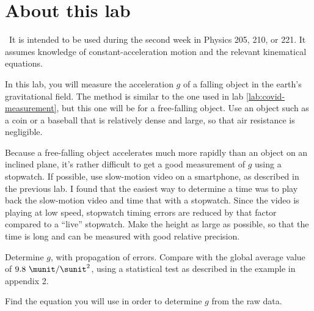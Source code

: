 \addtocounter{chapter}{-1}
\renewcommand\thechapter{c1.2a}
\label{lab:covid-g}

\section*{About this lab}

\covid\ 
It is intended to be used during the second week in Physics 205, 210, or 221.
It assumes knowledge of constant-acceleration motion and the relevant kinematical equations.

\observations

In this lab, you will measure the acceleration $g$ of a falling object in the earth's
gravitational field. The method is similar to the one used in lab \ref{lab:covid-measurement},
but this one will be for a free-falling object. Use an object such as a coin or a baseball
that is relatively dense and large, so that air resistance is negligible.

Because a free-falling object accelerates much more rapidly than an object on an inclined
plane, it's rather difficult to get a good measurement of $g$ using a stopwatch. If possible,
use slow-motion video on a smartphone, as described in the previous lab. I found that the
easiest way to determine a time was to play back the slow-motion video and time that with
a stopwatch. Since the video is playing at low speed, stopwatch timing errors are reduced
by that factor compared to a ``live'' stopwatch. Make the height as
large as possible, so that the time is long and can be measured with good relative precision.


\analysis

Determine $g$, with propagation of errors. Compare with the global average value of $9.8\ \munit/\sunit^2$,
using a statistical test as described in the example in appendix 2.

\prelab

\prelabquestion  
Find the equation you will use in order to determine $g$ from the raw data.




